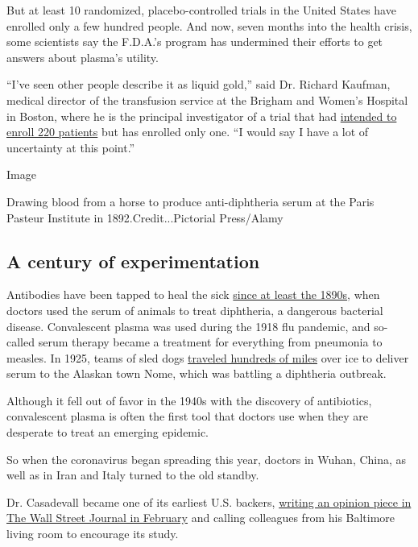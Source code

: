But at least 10 randomized, placebo-controlled trials in the United
States have enrolled only a few hundred people. And now, seven months
into the health crisis, some scientists say the F.D.A.'s program has
undermined their efforts to get answers about plasma's utility.

``I've seen other people describe it as liquid gold,'' said Dr. Richard
Kaufman, medical director of the transfusion service at the Brigham and
Women's Hospital in Boston, where he is the principal investigator of a
trial that had
\href{https://clinicaltrials.gov/ct2/show/NCT04361253?term=convalescent+plasma\&type=Intr\&cond=COVID\&intr=randomized\&draw=3\&rank=11}{intended
to enroll 220 patients} but has enrolled only one. ``I would say I have
a lot of uncertainty at this point.''

Image

Drawing blood from a horse to produce anti-diphtheria serum at the Paris
Pasteur Institute in 1892.Credit...Pictorial Press/Alamy

\hypertarget{a-century-of-experimentation}{%
\subsection{A century of
experimentation}\label{a-century-of-experimentation}}

Antibodies have been tapped to heal the sick
\href{https://academic.oup.com/cid/article/21/1/150/402600}{since at
least the 1890s}, when doctors used the serum of animals to treat
diphtheria, a dangerous bacterial disease. Convalescent plasma was used
during the 1918 flu pandemic, and so-called serum therapy became a
treatment for everything from pneumonia to measles. In 1925, teams of
sled dogs
\href{http://www.bbc.com/earth/story/20161014-in-1925-a-remote-town-was-saved-from-lethal-disease-by-dogs}{traveled
hundreds of miles} over ice to deliver serum to the Alaskan town Nome,
which was battling a diphtheria outbreak.

Although it fell out of favor in the 1940s with the discovery of
antibiotics, convalescent plasma is often the first tool that doctors
use when they are desperate to treat an emerging epidemic.

So when the coronavirus began spreading this year, doctors in Wuhan,
China, as well as in Iran and Italy turned to the old standby.

Dr. Casadevall became one of its earliest U.S. backers,
\href{https://www.wsj.com/articles/how-a-boys-blood-stopped-an-outbreak-11582847330}{writing
an opinion piece in The Wall Street Journal in February} and calling
colleagues from his Baltimore living room to encourage its study.

